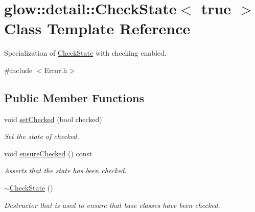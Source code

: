 \hypertarget{classglow_1_1detail_1_1_check_state_3_01true_01_4}{}\section{glow\+:\+:detail\+:\+:Check\+State$<$ true $>$ Class Template Reference}
\label{classglow_1_1detail_1_1_check_state_3_01true_01_4}


Specialization of \hyperlink{classglow_1_1detail_1_1_check_state}{Check\+State} with checking enabled.  




{\ttfamily \#include $<$Error.\+h$>$}

\subsection*{Public Member Functions}
\begin{DoxyCompactItemize}
\item 
\mbox{\label{classglow_1_1detail_1_1_check_state_3_01true_01_4_ae390e25f37f67c18a8225ec19592e435}} 
void \hyperlink{classglow_1_1detail_1_1_check_state_3_01true_01_4_ae390e25f37f67c18a8225ec19592e435}{set\+Checked} (bool checked)
\begin{DoxyCompactList}\small\item\em Set the state of checked. \end{DoxyCompactList}\item 
\mbox{\label{classglow_1_1detail_1_1_check_state_3_01true_01_4_a0ec423b9f787c0956ff4e619fd9c855d}} 
void \hyperlink{classglow_1_1detail_1_1_check_state_3_01true_01_4_a0ec423b9f787c0956ff4e619fd9c855d}{ensure\+Checked} () const
\begin{DoxyCompactList}\small\item\em Asserts that the state has been checked. \end{DoxyCompactList}\item 
\mbox{\label{classglow_1_1detail_1_1_check_state_3_01true_01_4_aefe24f946976dc66a6af4a6d53a5f4b1}} 
\hyperlink{classglow_1_1detail_1_1_check_state_3_01true_01_4_aefe24f946976dc66a6af4a6d53a5f4b1}{$\sim$\+Check\+State} ()
\begin{DoxyCompactList}\small\item\em Destructor that is used to ensure that base classes have been checked. \end{DoxyCompactList}\end{DoxyCompactItemize}


